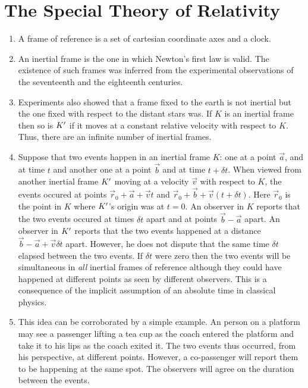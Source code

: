 \chapter{The Special Theory of Relativity}\label{c1}
\begin{enumerate}
\item A frame of reference is a set of cartesian coordinate axes and a clock.

\item An inertial frame is the one in which Newton's first law is valid. The 
existence of such frames was inferred from the experimental observations of the
seventeenth and the eighteenth centuries.

\item Experiments also showed that a frame fixed to the earth is not inertial
but the one fixed with respect to the distant stars was. If $K$ is an inertial
frame then so is $K^\prime$ if it moves at a constant relative velocity with respect
to $K$. Thus, there are an infinite number of inertial frames.

\item Suppose that two events happen in an inertial frame $K$: one at a point
$\vec{a}$, and at time $t$ and another one at a point $\vec{b}$ and at time 
$t + \delta t$. When viewed from another inertial frame $K^\prime$ moving at a 
velocity $\vec{v}$ with respect to $K$, the events occured at points $\vec{r}_0 
+ \vec{a} + \vec{v}t$ and $\vec{r}_0 + \vec{b} +\vec{v}(t + \delta t)$. Here 
$\vec{r}_0$ is the point in $K$ where $K^\prime$'s origin was at $t=0$. An observer 
in $K$ reports that the two events occured at times $\delta t$ apart and at points 
$\vec{b} - \vec{a}$ apart. An observer in $K^\prime$ reports that the two events 
happened at a distance $\vec{b} - \vec{a} + \vec{v}\delta t$ apart. However, 
he does not dispute that the same time $\delta t$ elapsed between the two events. 
If $\delta t$ were zero then the two events will be simultaneous in \emph{all} 
inertial frames of reference although they could have happened at different 
points as seen by different observers. This is a consequence of the implicit 
assumption of an absolute time in classical physics.

\item This idea can be corroborated by a simple example. An person on a platform may
see a passenger lifting a tea cup as the coach entered the platform and take it
to his lips as the coach exited it. The two events thus occurred, from his 
perspective, at different points. However, a co-passenger will report them to
be happening at the same spot. The observers will agree on the duration between
the events.


\end{enumerate}
